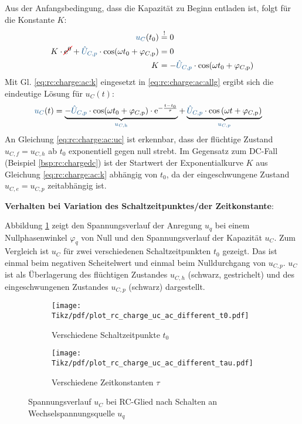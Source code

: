 \begin{frame}[t]
{    Aus der Anfangsbedingung, dass die Kapazität zu Beginn entladen ist, folgt für die Konstante $K$:
    \begin{align}
        \ecv{u_C}(t_0) &\overset{!}{=} 0 \nonumber\\
        K \cdot \redcancel{\mathrm{e}^{0}} + \ecv{\hat{U}_{C,p}} \cdot \cos(\omega t_0 + \varphi_{C,\mathrm{p}}) &= 0 \nonumber\\
        K &= -\ecv{\hat{U}_{C,p}} \cdot \cos(\omega t_0 + \varphi_{C,\mathrm{p}}) \label{eq:rc:charge:ac:k}
    \end{align}
    Mit Gl. \ref{eq:rc:charge:ac:k} eingesetzt in \ref{eq:rc:charge:ac:allg} ergibt sich die eindeutige Lösung für $u_C(t)$:
    \begin{align}
        \ecv{u_C}(t) &= \underbrace{-\ecv{\hat{U}_{C,p}} \cdot \cos(\omega t_0 + \varphi_{C,\mathrm{p}}) \cdot \mathrm{e}^{-\frac{t-t_0}{\tau}}}_{\ecv{u_{C,\mathrm{h}}}} + \underbrace{\ecv{\hat{U}_{C,p}} \cdot \cos\left(\omega t + \varphi_{C,\mathrm{p}}\right)}_{\ecv{u_{C,p}}} \label{eq:rc:charge:ac:uc}
    \end{align}
    An Gleichung \ref{eq:rc:charge:ac:uc} ist erkennbar, dass der flüchtige Zustand $u_{C,f}=u_{C,h}$ ab $t_0$ exponentiell gegen null strebt.
    Im Gegensatz zum DC-Fall (Beispiel \ref{bsp:rc:chargedc}) ist der Startwert der Exponentialkurve $K$ aus Gleichung \ref{eq:rc:charge:ac:k} abhängig von $t_0$, da der eingeschwungene Zustand $u_{C,e}=u_{C,p}$ zeitabhängig ist.

    \textbf{Verhalten bei Variation des Schaltzeitpunktes/der Zeitkonstante}:

    Abbildung \ref{fig:plot:rc:charge:ac:uc:vergleicht0} zeigt den Spannungsverlauf der Anregung $u_q$ bei einem Nullphasenwinkel $\varphi_q$ von Null
    und den Spannungsverlauf der Kapazität $u_C$.
    Zum Vergleich ist $u_C$ für zwei verschiedenen Schaltzeitpunkten $t_0$ gezeigt.
    Das ist einmal beim negativen Scheitelwert und einmal beim Nulldurchgang von $u_{C,p}$.
    $u_C$ ist als Überlagerung des flüchtigen Zustandes $u_{C,h}$ (schwarz, gestrichelt) und des eingeschwungenen Zustandes $u_{C,p}$ (schwarz) dargestellt.

    \begin{figure}[H]\centering
        \begin{subfigure}{0.48\textwidth}\centering
            \texttt{[image: Tikz/pdf/plot\_rc\_charge\_uc\_ac\_different\_t0.pdf]} %
            \caption{Verschiedene Schaltzeitpunkte $t_0$}
            \label{fig:plot:rc:charge:ac:uc:vergleicht0}
        \end{subfigure}%
        \begin{subfigure}{0.48\textwidth}\centering
            \texttt{[image: Tikz/pdf/plot\_rc\_charge\_uc\_ac\_different\_tau.pdf]} %
            \caption{Verschiedene Zeitkonstanten $\tau$}
            \label{fig:plot:rc:charge:ac:uc:vergleichtau}
        \end{subfigure}
        \caption{Spannungsverlauf $u_C$ bei RC-Glied nach Schalten an Wechselspannungsquelle $u_q$}
    \end{figure}

}
\end{frame}
